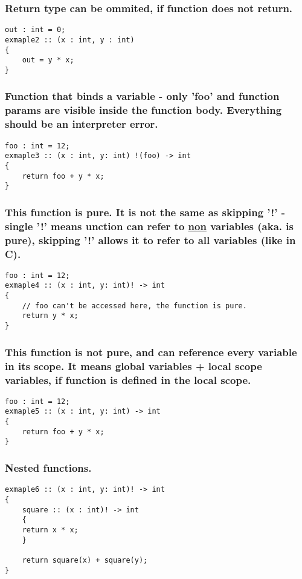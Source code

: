 \documentclass[11pt]{article}
\begin{document}
\subsubsection*{Return type can be ommited, if function does not return.}
\label{sec:org811cef9}
\begin{verbatim}
out : int = 0;
exmaple2 :: (x : int, y : int)
{
    out = y * x;
}
\end{verbatim}

\subsubsection*{Function that binds a variable - only 'foo' and function params are visible inside the function body. Everything should be an interpreter error.}
\label{sec:org62b8511}
\begin{verbatim}
foo : int = 12;
exmaple3 :: (x : int, y: int) !(foo) -> int
{
    return foo + y * x;
}
\end{verbatim}

\subsubsection*{This function is pure. It is not the same as skipping '!' - single '!' means unction can refer to \underline{non} variables (aka. is pure), skipping '!' allows it to refer to all variables (like in C).}
\label{sec:orge013653}
\begin{verbatim}
foo : int = 12;
exmaple4 :: (x : int, y: int)! -> int
{
    // foo can't be accessed here, the function is pure.
    return y * x;
}
\end{verbatim}

\subsubsection*{This function is not pure, and can reference every variable in its scope. It means global variables + local scope variables, if function is defined in the local scope.}
\label{sec:org5318589}
\begin{verbatim}
foo : int = 12;
exmaple5 :: (x : int, y: int) -> int
{
    return foo + y * x;
}
\end{verbatim}

\subsubsection*{Nested functions.}
\label{sec:org15cddd5}
\begin{verbatim}
exmaple6 :: (x : int, y: int)! -> int
{
    square :: (x : int)! -> int
    {
	return x * x;
    }

    return square(x) + square(y);
}
\end{verbatim}
\end{document}
